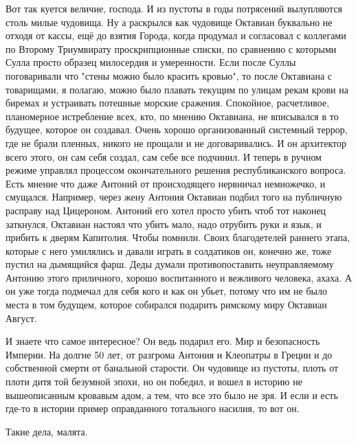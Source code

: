 Вот так куется величие, господа. И из пустоты в годы потрясений вылупляются столь милые чудовища. Ну а раскрылся как чудовище Октавиан буквально не отходя от кассы, ещё до взятия Города, когда продумал и согласовал с коллегами по Второму Триумвирату проскрипционные списки, по сравнению с которыми Сулла просто образец милосердия и умеренности. Если после Суллы поговаривали что "стены можно было красить кровью", то после Октавиана с товарищами, я полагаю, можно было плавать текущим по улицам рекам крови на биремах и устраивать потешные морские сражения. Спокойное, расчетливое, планомерное истребление всех, кто, по мнению Октавиана, не вписывался в то будущее, которое он создавал. Очень хорошо организованный системный террор, где не брали пленных, никого не прощали и не договаривались. И он архитектор всего этого, он сам себя создал, сам себе все подчинил. И теперь в ручном режиме управлял процессом окончательного решения республиканского вопроса. Есть мнение что даже Антоний от происходящего нервничал немножечко, и смущался. Например, через жену Антония Октавиан подбил того на публичную расправу над Цицероном. Антоний его хотел просто убить чтоб тот наконец заткнулся, Октавиан настоял что убить мало, надо отрубить руки и язык, и прибить к дверям Капитолия. Чтобы помнили. Своих благодетелей раннего этапа, которые с него умилялись и давали играть в солдатиков он, конечно же, тоже пустил на дымящийся фарш. Деды думали противопоставить неуправляемому Антонию этого приличного, хорошо воспитанного и вежливого человека, ахаха. А он уже тогда подмечал для себя кого и как он убьет, потому что им не было места в том будущем, которое собирался подарить римскому миру Октавиан Август.


И знаете что самое интересное? Он ведь подарил его. Мир и безопасность Империи. На долгие 50 лет, от разгрома Антония и Клеопатры в Греции и до собственной смерти от банальной старости. Он чудовище из пустоты, плоть от плоти дитя той безумной эпохи, но он победил, и вошел в историю не вышеописанным кровавым адом, а тем, что все это было не зря. И если и есть где-то в истории пример оправданного тотального насилия, то вот он.


Такие дела, малята. 
